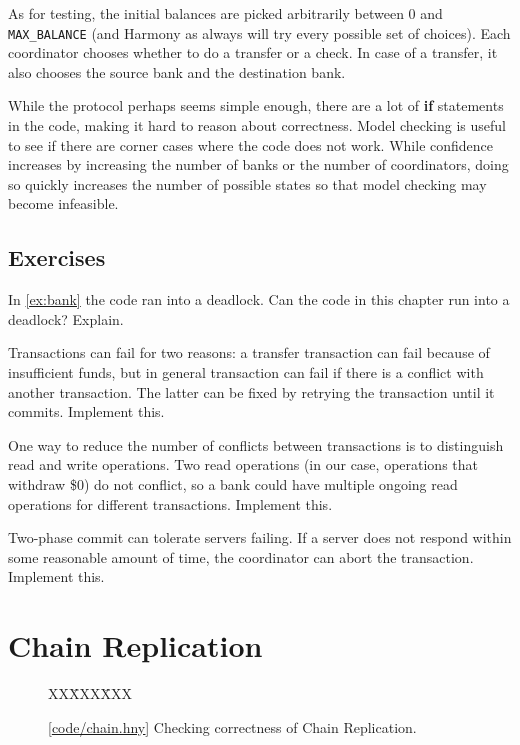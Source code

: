 \documentclass{report}
\newcommand{\harmonysource}[1]{
\begin{tabbing}
XX\=XXX\=XXX\kill
    
\end{tabbing}
}
\newcommand{\harmonylink}[1]{%
[\href{https://harmony.cs.cornell.edu/#1}{\underline{#1}}]%
}
\newenvironment{code}{
\tcolorbox
}{
\endtcolorbox
}
\begin{document}
As for testing, the initial balances are picked arbitrarily between
0 and \texttt{MAX\_BALANCE} (and Harmony as always will try every
possible set of choices).
Each coordinator chooses whether to do a transfer or a check.  In
case of a transfer, it also chooses the source bank and the destination
bank.

While the protocol perhaps seems simple enough, there are a lot of
\textbf{if} statements in the code, making it hard to reason about
correctness.
Model checking is useful to see if there are corner
cases where the code does not work.
While confidence increases by
increasing the number of banks or the number of coordinators, doing so
quickly increases the number of possible states so that model checking
may become infeasible.

\section*{Exercises}
\begin{problems}
\item In \autoref{ex:bank} the code ran into a deadlock.  Can the code
in this chapter run into a deadlock?  Explain.
\item Transactions can fail for two reasons: a transfer transaction can
fail because of insufficient funds, but in general transaction can fail
if there is a conflict with another transaction.  The latter can be
fixed by retrying the transaction until it commits.  Implement this.
\item One way to reduce the number of conflicts between transactions
is to distinguish read and write operations.  Two read operations
(in our case, operations that withdraw \$0) do not conflict,
so a bank could have multiple ongoing read operations
for different transactions.  Implement this.
\item Two-phase commit can tolerate servers failing.  If a server does not
respond within some reasonable amount of time, the coordinator can abort
the transaction.  Implement this.
\end{problems}

\chapter{Chain Replication}
\label{ch:chain}

\begin{figure}
\begin{code}
\harmonysource{chain}
\end{code}
\caption{\harmonylink{code/chain.hny} Checking correctness of Chain Replication.}
\label{fig:chain}
\end{figure}
\end{document}
